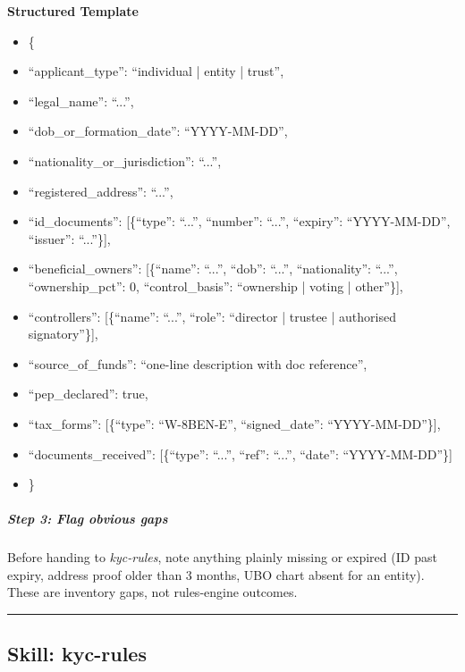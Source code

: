 \documentclass[11pt]{article}
\begin{document}
\textbf{Structured Template}
\begin{itemize}[leftmargin=*,itemsep=2pt,topsep=2pt]
\item {} \{
\item {} ``applicant\_\allowbreak{}type'': ``individual | entity | trust'',
\item {} ``legal\_\allowbreak{}name'': ``...'',
\item {} ``dob\_\allowbreak{}or\_\allowbreak{}formation\_\allowbreak{}date'': ``YYYY-MM-DD'',
\item {} ``nationality\_\allowbreak{}or\_\allowbreak{}jurisdiction'': ``...'',
\item {} ``registered\_\allowbreak{}address'': ``...'',
\item {} ``id\_\allowbreak{}documents'': [\{``type'': ``...'', ``number'': ``...'', ``expiry'': ``YYYY-MM-DD'', ``issuer'': ``...''\}],
\item {} ``beneficial\_\allowbreak{}owners'': [\{``name'': ``...'', ``dob'': ``...'', ``nationality'': ``...'', ``ownership\_\allowbreak{}pct'': 0, ``control\_\allowbreak{}basis'': ``ownership | voting | other''\}],
\item {} ``controllers'': [\{``name'': ``...'', ``role'': ``director | trustee | authorised signatory''\}],
\item {} ``source\_\allowbreak{}of\_\allowbreak{}funds'': ``one-line description with doc reference'',
\item {} ``pep\_\allowbreak{}declared'': true,
\item {} ``tax\_\allowbreak{}forms'': [\{``type'': ``W-8BEN-E'', ``signed\_\allowbreak{}date'': ``YYYY-MM-DD''\}],
\item {} ``documents\_\allowbreak{}received'': [\{``type'': ``...'', ``ref'': ``...'', ``date'': ``YYYY-MM-DD''\}]
\item {} \}
\end{itemize}

\subparagraph{Step 3: Flag obvious gaps}\mbox{}\par

Before handing to \emph{kyc-rules}, note anything plainly missing or expired (ID past expiry, address proof older than 3 months, UBO chart absent for an entity). These are inventory gaps, not rules-engine outcomes.


\vspace{0.8em}\hrule\vspace{0.8em}

\subsection{Skill: kyc-rules}\label{file:skills-kyc-rules-SKILL-md}
\end{document}
